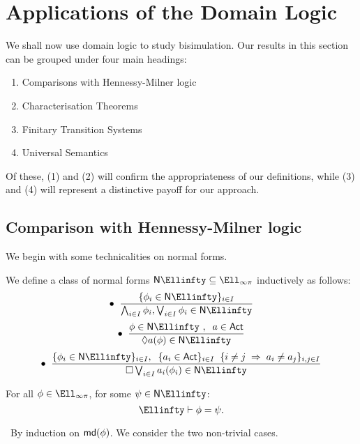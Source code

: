 \section{Applications of the Domain Logic}
We shall now use domain logic to study bisimulation.
Our results in this section can be grouped under four main headings:
\begin{enumerate}
\item Comparisons with Hennessy-Milner logic 
\item Characterisation Theorems
\item Finitary Transition Systems
\item Universal Semantics
\end{enumerate}
Of these, (1) and (2) will confirm the appropriateness of our definitions, while (3) and (4) will represent a distinctive payoff for our approach.

\subsection*{Comparison with Hennessy-Milner logic}
We begin with some technicalities on normal forms.
\begin{definition}
{\rm We define a class of normal forms ${\sf N} \Ellinfty \subseteq \Ell_{\infty \pi}$ inductively as follows:}
\[ \bullet \;\; \frac{ \{\phi_{i} \in {\sf N} \Ellinfty \}_{i \in I}}{\bigwedge_{i \in I} \phi_{i}, \bigvee_{i \in I} \phi_{i} \in {\sf N} \Ellinfty} \]
\[ \bullet \;\; \frac{\phi \in {\sf N} \Ellinfty\ , \;\; a \in {\sf Act}}{\Diamond a(\phi ) \in {\sf N} \Ellinfty} \]
\[ \bullet \;\; \frac{ \{ \phi_{i} \in {\sf N} \Ellinfty \}_{i \in I}, \;\; \{ a_{i} \in {\sf Act} \}_{i \in I} \;\; \{ i \not= j \; \Rightarrow \; a_{i} \not= a_{j} \}_{i, j \in I}}
{\Box \bigvee_{i \in I} a_{i} ( \phi_{i}) \in {\sf N} \Ellinfty} \]
\end{definition}

\begin{lemma}
\label{hmnf}
For all $\phi \in \Ell_{\infty \pi}$, for some $\psi \in {\sf N} \Ellinfty$:
\[ \Ellinfty  \vdash  \phi = \psi . \]
\end{lemma}

\proof\ By induction on ${\sf md}(\phi )$.
We consider the two non-trivial cases.

